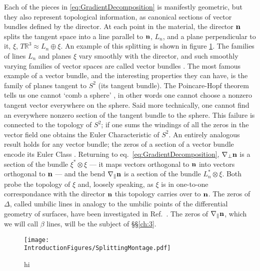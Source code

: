 Each of the pieces in \ref{eq:GradientDecomposition} is manifestly geometric, but they also represent topological information, as canonical sections of vector bundles defined by the director. At each point in the material, the director $\bf n$ splits the tangent space into a line parallel to $\bf n$, $L_n$, and a plane perpendicular to it, $\xi$, $T \mathbb{R}^3 \approx L_n \oplus \xi$. An example of this splitting is shown in figure \ref{fig:SplittingMontage}. The families of lines $L_n$ and planes $\xi$ vary smoothly with the director, and such smoothly varying families of vector spaces are called vector bundles \cite{}. The most famous example of a vector bundle, and the interesting properties they can have, is the family of planes tangent to $S^2$ (its tangent bundle). The Poincare-Hopf theorem tells us one cannot `comb a sphere' \cite{}, in other words one cannot choose a nonzero tangent vector everywhere on the sphere. Said more technically, one cannot find an everywhere nonzero section of the tangent bundle to the sphere. This failure is connected to the topology of $S^2$; if one sums the windings of all the zeros in the vector field one obtains the Euler Characteristic of $S^2$. An entirely analogous result holds for any vector bundle; the zeros of a section of a vector bundle encode its Euler Class \cite{}. Returning to eq.~\ref{eq:GradientDecomposition}, $\nabla_\perp \bf n$ is a section of the bundle $\xi^* \otimes \xi$ --- it maps vectors orthogonal to $\bf n$ into vectors orthogonal to $\bf n$ --- and the bend $\nabla_\parallel \bf n$ is a section of the bundle $L_n^* \otimes \xi$. Both probe the topology of $\xi$ and, loosely speaking, as $\xi$ is in one-to-one correspondance with the director $\bf n$ this topology carries over to $\bf n$. The zeros of $\Delta$, called umbilic lines in analogy to the umbilic points of the differential geometry of surfaces, have been investigated in Ref.~\cite{Machon}. The zeros of $\nabla_{\parallel} \bf n$, which we will call $\beta$ lines, will be the subject of \S\S\ref{ch:3}.
\begin{figure}[htbp]
\centering
\texttt{[image: \\IntroductionFigures/SplittingMontage.pdf]}
\caption{hi }
\label{fig:SplittingMontage}
\end{figure}

